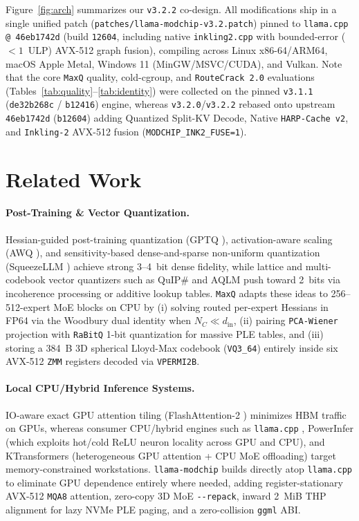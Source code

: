 \documentclass[10pt,twocolumn]{article}
\begin{document}
Figure~\ref{fig:arch} summarizes our \texttt{v3.2.2} co-design. All modifications ship in a single unified patch (\texttt{patches/llama-modchip-v3.2.patch}) pinned to \texttt{llama.cpp @ 46eb1742d} (build \texttt{12604}, including native \texttt{inkling2.cpp} with bounded-error ($<1$~ULP) AVX-512 graph fusion), compiling across Linux x86-64/ARM64, macOS Apple Metal, Windows 11 (MinGW/MSVC/CUDA), and Vulkan. Note that the core \texttt{MaxQ} quality, cold-cgroup, and \texttt{RouteCrack 2.0} evaluations (Tables~\ref{tab:quality}--\ref{tab:identity}) were collected on the pinned \texttt{v3.1.1} (\texttt{de32b268c} / \texttt{b12416}) engine, whereas \texttt{v3.2.0}/\texttt{v3.2.2} rebased onto upstream \texttt{46eb1742d} (\texttt{b12604}) adding Quantized Split-KV Decode, Native \texttt{HARP-Cache v2}, and \texttt{Inkling-2} AVX-512 fusion (\texttt{MODCHIP\_INK2\_FUSE=1}).

\section{Related Work}
\label{sec:related}

\paragraph{Post-Training \& Vector Quantization.}
Hessian-guided post-training quantization (GPTQ \cite{frantar2023gptq}), activation-aware scaling (AWQ \cite{lin2024awq}), and sensitivity-based dense-and-sparse non-uniform quantization (SqueezeLLM \cite{squeezellm}) achieve strong 3--4~bit dense fidelity, while lattice and multi-codebook vector quantizers such as QuIP\# \cite{tseng2024quip} and AQLM \cite{egiazarian2024aqlm} push toward 2~bits via incoherence processing or additive lookup tables. \texttt{MaxQ} adapts these ideas to 256--512-expert MoE blocks on CPU by (i) solving routed per-expert Hessians in FP64 via the Woodbury dual identity when $N_C \ll d_{\text{in}}$, (ii) pairing \texttt{PCA-Wiener} projection with \texttt{RaBitQ} \cite{rabitq2024} 1-bit quantization for massive PLE tables, and (iii) storing a 384~B 3D spherical Lloyd-Max codebook (\texttt{VQ3\_64}) entirely inside six AVX-512 \texttt{ZMM} registers decoded via \texttt{VPERMI2B}.

\paragraph{Local CPU/Hybrid Inference Systems.}
IO-aware exact GPU attention tiling (FlashAttention-2 \cite{dao2023flashattention2}) minimizes HBM traffic on GPUs, whereas consumer CPU/hybrid engines such as \texttt{llama.cpp} \cite{llamacpp}, PowerInfer \cite{powerinfer} (which exploits hot/cold ReLU neuron locality across GPU and CPU), and KTransformers \cite{ktransformers} (heterogeneous GPU attention + CPU MoE offloading) target memory-constrained workstations. \texttt{llama-modchip} builds directly atop \texttt{llama.cpp} to eliminate GPU dependence entirely where needed, adding register-stationary AVX-512 \texttt{MQA8} attention, zero-copy 3D MoE \texttt{{-}{-}repack}, inward 2~MiB THP alignment for lazy NVMe PLE paging, and a zero-collision \texttt{ggml} ABI.
\end{document}
